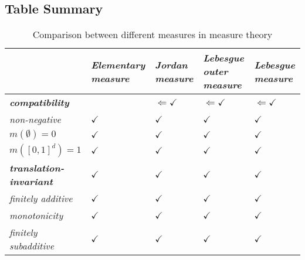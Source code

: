 \documentclass[11pt]{article}
\begin{document}
\subsection{Table Summary}
\begin{table}[h!]
\setlength{\abovedisplayskip}{0pt}
\setlength{\belowdisplayskip}{-10pt}
\setlength{\abovedisplayshortskip}{0pt}
\setlength{\belowdisplayshortskip}{0pt}
\footnotesize
\centering
\caption{Comparison between different measures in measure theory}
\label{tab: measure}
\renewcommand\tabularxcolumn[1]{m{#1}}
\small
\begin{tabularx}{1\textwidth} { 
  | >{\raggedright\arraybackslash} m{3cm}
  | >{\centering\arraybackslash}X
  | >{\centering\arraybackslash}X
  | >{\centering\arraybackslash}X
  | >{\centering\arraybackslash}X  | }
 \hline
  &  \emph{\textbf{Elementary measure}} & \emph{\textbf{Jordan measure}}   &  \emph{\textbf{Lebesgue outer measure}}   & \emph{\textbf{Lebesgue measure}} \\
  \hline 
\textbf{\emph{compatibility}}    & & $\Leftarrow \checkmark$  & $\Leftarrow \checkmark$  & $\Leftarrow \checkmark$ \\
 \hline
\emph{non-negative} &  $\checkmark$  & $\checkmark$  & $\checkmark$  & $\checkmark$  \\
 \hline
$m(\emptyset) = 0$  &  $\checkmark$  & $\checkmark$  & $\checkmark$  & $\checkmark$  \\
\hline
$m([0,1]^d) = 1$  &  $\checkmark$  & $\checkmark$  & $\checkmark$  & $\checkmark$  \\
\hline \vspace{5pt}
\emph{\textbf{translation-invariant}}  \vspace{-5pt} &  $\checkmark$  & $\checkmark$  & $\checkmark$  & $\checkmark$ \\
\hline \vspace{5pt}
\emph{finitely additive}   \vspace{2pt}&  $\checkmark$  & $\checkmark$  & $\checkmark$  & $\checkmark$   \\
\hline \vspace{5pt}
\emph{monotonicity}   \vspace{2pt}&  $\checkmark$  & $\checkmark$  & $\checkmark$  & $\checkmark$   \\
\hline \vspace{5pt}
\emph{finitely subadditive}   \vspace{2pt}&  $\checkmark$  & $\checkmark$  & $\checkmark$  & $\checkmark$   \\

\end{tabularx}
\end{table}
\end{document}
